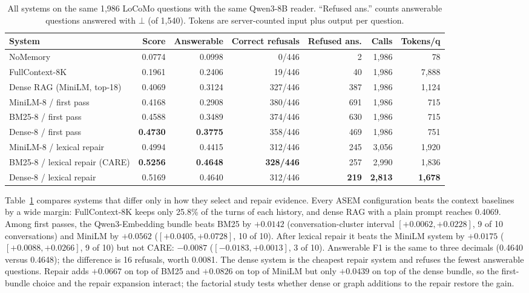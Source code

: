 \documentclass[10pt]{article}
\theoremstyle{plain}
\theoremstyle{definition}
\newcommand{\asem}{\textsc{ASEM}}
\newcommand{\care}{\textsc{CARE}}
\begin{document}
\begin{table}[t]
\centering
\caption{All systems on the same 1,986 LoCoMo questions with the same Qwen3-8B reader. ``Refused ans.''
counts answerable questions answered with $\bot$ (of 1,540). Tokens are server-counted input plus output
per question.}
\label{tab:main}
\small
\begin{tabular}{lrrrrrr}
\toprule
System & Score & Answerable & Correct refusals & Refused ans. & Calls & Tokens/q \\
\midrule
NoMemory & 0.0774 & 0.0998 & 0/446 & 2 & 1,986 & 78 \\
FullContext-8K & 0.1961 & 0.2406 & 19/446 & 40 & 1,986 & 7,888 \\
Dense RAG (MiniLM, top-18) & 0.4069 & 0.3124 & 327/446 & 387 & 1,986 & 1,124 \\
\midrule
MiniLM-8 / first pass & 0.4168 & 0.2908 & 380/446 & 691 & 1,986 & 715 \\
BM25-8 / first pass & 0.4588 & 0.3489 & 374/446 & 630 & 1,986 & 715 \\
Dense-8 / first pass & \textbf{0.4730} & \textbf{0.3775} & 358/446 & 469 & 1,986 & 751 \\
\midrule
MiniLM-8 / lexical repair & 0.4994 & 0.4415 & 312/446 & 245 & 3,056 & 1,920 \\
BM25-8 / lexical repair (\care{}) & \textbf{0.5256} & \textbf{0.4648} & \textbf{328/446} & 257 & 2,990 & 1,836 \\
Dense-8 / lexical repair & 0.5169 & 0.4640 & 312/446 & \textbf{219} & \textbf{2,813} & \textbf{1,678} \\
\bottomrule
\end{tabular}
\end{table}

Table~\ref{tab:main} compares systems that differ only in how they select and repair evidence. Every
\asem{} configuration beats the context baselines by a wide margin: FullContext-8K keeps only 25.8\% of
the turns of each history, and dense RAG with a plain prompt reaches 0.4069. Among first passes, the
Qwen3-Embedding bundle beats BM25 by $+0.0142$ (conversation-cluster interval $[+0.0062,+0.0228]$, 9 of
10 conversations) and MiniLM by $+0.0562$ ($[+0.0405,+0.0728]$, 10 of 10). After lexical repair it
beats the MiniLM system by $+0.0175$ ($[+0.0088,+0.0266]$, 9 of 10) but not \care{}: $-0.0087$
($[-0.0183,+0.0013]$, 3 of 10). Answerable F1 is the same to three decimals (0.4640 versus 0.4648); the
difference is 16 refusals, worth 0.0081. The dense system is the cheapest repair system and refuses the
fewest answerable questions. Repair adds $+0.0667$ on top of BM25 and $+0.0826$ on top of MiniLM but
only $+0.0439$ on top of the dense bundle, so the first-bundle choice and the repair expansion interact;
the factorial study tests whether dense or graph additions to the repair restore the gain.
\end{document}
